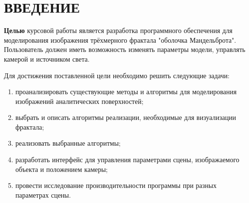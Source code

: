 \section*{ВВЕДЕНИЕ}

\textbf{Целью} курсовой работы является разработка программного обеспечения для моделирования изображения
трёхмерного фрактала "оболочка Мандельброта". Пользователь должен иметь возможность изменять
параметры модели, управлять камерой и источником света.

Для достижения поставленной цели необходимо решить следующие задачи:
\begin{enumerate}
  \item проанализировать существующие методы и алгоритмы для моделирования изображений
    аналитических поверхностей;
	\item выбрать и описать алгоритмы реализации, необходимые для визуализации фрактала;
	\item реализовать выбранные алгоритмы;
  \item разработать интерфейс для управления параметрами сцены, изображаемого объекта
    и положением камеры;
  \item провести исследование производительности программы при разных параметрах сцены.
\end{enumerate}

\clearpage

